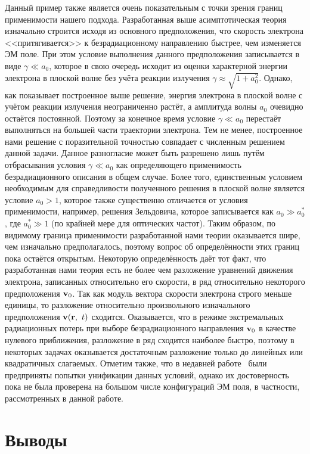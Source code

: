 Данный пример также является очень показательным с точки зрения границ применимости нашего подхода.
Разработанная выше асимптотическая теория изначально строится исходя из основного предположения, что скорость электрона <<притягивается>> к безрадиационному направлению быстрее, чем изменяется ЭМ поле.
При этом условие выполнения данного предположения записывается в виде $\gamma \ll a_0$, которое в свою очередь исходит из оценки характерной энергии электрона в плоской волне без учёта реакции излучения $\gamma\approx\sqrt{1+a_0^2}$.
Однако, как показывает построенное выше решение, энергия электрона в плоской волне с учётом реакции излучения неограниченно растёт, а амплитуда волны $a_0$ очевидно остаётся постоянной.
Поэтому за конечное время условие $\gamma \ll a_0$ перестаёт выполняться на большей части траектории электрона.
Тем не менее, построенное нами решение с поразительной точностью совпадает с численным решением данной задачи.
Данное разногласие может быть разрешено лишь путём отбрасывания условия $\gamma \ll a_0$ как определяющего применимость безрадиационного описания в общем случае.
Более того, единственным условием необходимым для справедливости полученного решения в плоской волне является условие $a_0 > 1$, которое также существенно отличается от условия применимости, например, решения Зельдовича, которое записывается как ${a_0 \gg a_0^*}$, где ${a_0^* \gg 1}$ (по крайней мере для оптических частот).
Таким образом, по видимому граница применимости разработанной нами теории оказывается шире, чем изначально предполагалось, поэтому вопрос об определённости этих границ пока остаётся открытым.
Некоторую определённость даёт тот факт, что разработанная нами теория есть не более чем разложение уравнений движения электрона, записанных относительно его скорости, в ряд относительно некоторого предположения $\vb{v}_0$.
Так как модуль вектора скорости электрона строго меньше единицы, то разложение относительно произвольного изначального предположения $\vb{v}(\vb{r},\ t)$ сходится.
Оказывается, что в режиме экстремальных радиационных потерь при выборе безрадиационного направления $\vb{v}_0$ в качестве нулевого приближения, разложение в ряд сходится наиболее быстро, поэтому в некоторых задачах оказывается достаточным разложение только до линейных или квадратичных слагаемых.
Отметим также, что в недавней работе~\cite{cai2022dynamics} были предприняты попытки унификации данных условий, однако их достоверность пока не была проверена на большом числе конфигураций ЭМ поля, в частности, рассмотренных в данной работе. 

\section{Выводы}
\label{ch1/sec5}

